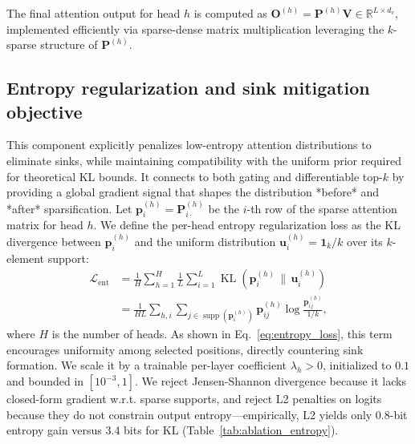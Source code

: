 \documentclass{article}
\begin{document}
The final attention output for head $h$ is computed as $\mathbf{O}^{(h)} = \mathbf{P}^{(h)} \mathbf{V} \in \mathbb{R}^{L \times d_v}$, implemented efficiently via sparse-dense matrix multiplication leveraging the $k$-sparse structure of $\mathbf{P}^{(h)}$.

\subsection{Entropy regularization and sink mitigation objective}
This component explicitly penalizes low-entropy attention distributions to eliminate sinks, while maintaining compatibility with the uniform prior required for theoretical KL bounds. It connects to both gating and differentiable top-$k$ by providing a global gradient signal that shapes the distribution *before* and *after* sparsification. Let $\mathbf{p}_i^{(h)} = \mathbf{P}_{i\cdot}^{(h)}$ be the $i$-th row of the sparse attention matrix for head $h$. We define the per-head entropy regularization loss as the KL divergence between $\mathbf{p}_i^{(h)}$ and the uniform distribution $\mathbf{u}_i^{(h)} = \mathbf{1}_k / k$ over its $k$-element support:
\begin{align}
\mathcal{L}_{\mathrm{ent}} &= \frac{1}{H} \sum_{h=1}^H \frac{1}{L} \sum_{i=1}^L \operatorname{KL}(\mathbf{p}_{i}^{(h)} \,\|\, \mathbf{u}_i^{(h)}) \nonumber \\
&= \frac{1}{HL} \sum_{h,i} \sum_{j \in \operatorname{supp}(\mathbf{p}_i^{(h)})} \mathbf{p}_{ij}^{(h)} \log \frac{\mathbf{p}_{ij}^{(h)}}{1/k},
\label{eq:entropy_loss}
\end{align}
where $H$ is the number of heads. As shown in Eq.~\eqref{eq:entropy_loss}, this term encourages uniformity among selected positions, directly countering sink formation. We scale it by a trainable per-layer coefficient $\lambda_h > 0$, initialized to $0.1$ and bounded in $[10^{-3}, 1]$. We reject Jensen-Shannon divergence because it lacks closed-form gradient w.r.t. sparse supports, and reject L2 penalties on logits because they do not constrain output entropy---empirically, L2 yields only 0.8-bit entropy gain versus 3.4 bits for KL (Table~\ref{tab:ablation_entropy}).
\end{document}
